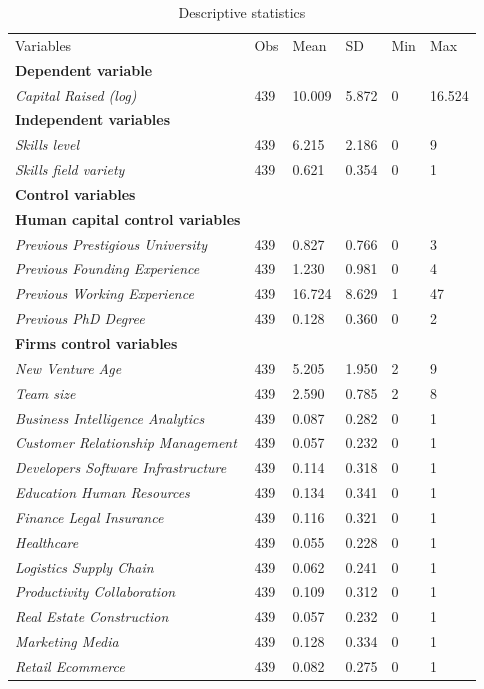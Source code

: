 \documentclass[12pt]{article}
\begin{document}
\clearpage
\begin{table} [ht]
\caption{Descriptive statistics}
\scriptsize
\renewcommand{\arraystretch}{1.5}
\begin{tabularx}{\textwidth}{ p{4.9cm} p{1.6cm} p{1.6cm} p{1.6cm} p{1.6cm} p{1.6cm} }
\toprule
\multicolumn{1}{l}{Variables}&\multicolumn{1}{l}{Obs}&\multicolumn{1}{l}{Mean}&\multicolumn{1}{l}{SD}&\multicolumn{1}{l}{Min}&\multicolumn{1}{l}{Max} \\
\cmidrule(r){1-6}
\textbf{Dependent variable} & & & & & \\
\textit{Capital Raised (log)} & 439 & 10.009 & 5.872 & 0 & 16.524 \\
\cmidrule(r){1-6}
\textbf{Independent variables} & & & & & \\
\textit{Skills level} & 439 & 6.215 & 2.186 & 0 & 9 \\
\textit{Skills field variety} & 439 & 0.621 & 0.354 & 0 & 1 \\
\cmidrule(r){1-6}\textbf{Control variables} & & & & & \\
\textbf{Human capital control variables} & & & & & \\
\textit{Previous Prestigious University} & 439 & 0.827 & 0.766 & 0 & 3 \\
\textit{Previous Founding Experience} & 439 & 1.230 & 0.981 & 0 & 4 \\
\textit{Previous Working Experience} & 439 & 16.724 & 8.629 & 1 & 47 \\
\textit{Previous PhD Degree} & 439 & 0.128 & 0.360 & 0 & 2 \\
\cmidrule(r){1-6}
\textbf{Firms control variables} & & & & & \\
\textit{New Venture Age} & 439 & 5.205 & 1.950 & 2 & 9 \\
\textit{Team size} & 439 & 2.590 & 0.785 & 2 & 8 \\
\textit{Business Intelligence Analytics} & 439 & 0.087 & 0.282 & 0 & 1 \\
\textit{Customer Relationship Management} & 439 & 0.057 & 0.232 & 0 & 1 \\
\textit{Developers Software Infrastructure} & 439 & 0.114 & 0.318 & 0 & 1 \\
\textit{Education Human Resources} & 439 & 0.134 & 0.341 & 0 & 1 \\
\textit{Finance Legal Insurance} & 439 & 0.116 & 0.321 & 0 & 1 \\
\textit{Healthcare} & 439 & 0.055 & 0.228 & 0 & 1 \\
\textit{Logistics Supply Chain} & 439 & 0.062 & 0.241	& 0 & 1 \\
\textit{Productivity Collaboration} & 439 & 0.109 & 0.312 & 0 & 1 \\
\textit{Real Estate Construction} & 439 & 0.057 & 0.232 & 0 & 1 \\
\textit{Marketing Media} & 439 & 0.128 & 0.334 & 0 & 1 \\
\textit{Retail Ecommerce} & 439 & 0.082 & 0.275 & 0 & 1 \\
\midrule
\end{tabularx}
\label{table4}
\end{table}
\end{document}
